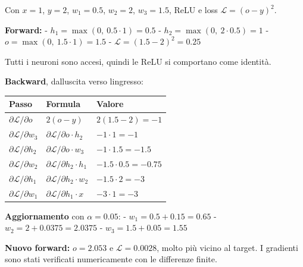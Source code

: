 \documentclass[11pt,a4paper,oneside,openany]{book}
\renewenvironment{quote}{\list{}{\leftmargin=1em\rightmargin=0pt}\item\relax}{\endlist}
\begin{document}
\begin{quote}
Con \(x = 1\), \(y = 2\), \(w_1 = 0.5\), \(w_2 = 2\), \(w_3 = 1.5\), ReLU e loss \(\mathcal{L} = (o-y)^2\).

\textbf{Forward:} - \(h_1 = \max(0,\ 0.5\cdot1) = 0.5\) - \(h_2 = \max(0,\ 2\cdot0.5) = 1\) - \(o = \max(0,\ 1.5\cdot1) = 1.5\) - \(\mathcal{L} = (1.5-2)^2 = 0.25\)

Tutti i neuroni sono accesi, quindi le ReLU si comportano come identità.

\textbf{Backward}, dall\textquotesingle uscita verso l\textquotesingle ingresso:

\begin{longtable}[]{@{}
  >{\raggedright\arraybackslash}p{}
  >{\raggedright\arraybackslash}p{}
  >{\raggedright\arraybackslash}p{}@{}}
\toprule\noalign{}
\begin{minipage}[b]{\linewidth}\raggedright
Passo
\end{minipage} & \begin{minipage}[b]{\linewidth}\raggedright
Formula
\end{minipage} & \begin{minipage}[b]{\linewidth}\raggedright
Valore
\end{minipage} \\
\midrule\noalign{}
\endhead
\bottomrule\noalign{}
\endlastfoot
\(\partial\mathcal{L}/\partial o\) & \(2(o-y)\) & \(2(1.5-2) = -1\) \\
\(\partial\mathcal{L}/\partial w_3\) & \(\partial\mathcal{L}/\partial o \cdot h_2\) & \(-1\cdot1 = -1\) \\
\(\partial\mathcal{L}/\partial h_2\) & \(\partial\mathcal{L}/\partial o \cdot w_3\) & \(-1\cdot1.5 = -1.5\) \\
\(\partial\mathcal{L}/\partial w_2\) & \(\partial\mathcal{L}/\partial h_2 \cdot h_1\) & \(-1.5\cdot0.5 = -0.75\) \\
\(\partial\mathcal{L}/\partial h_1\) & \(\partial\mathcal{L}/\partial h_2 \cdot w_2\) & \(-1.5\cdot2 = -3\) \\
\(\partial\mathcal{L}/\partial w_1\) & \(\partial\mathcal{L}/\partial h_1 \cdot x\) & \(-3\cdot1 = -3\) \\
\end{longtable}

\textbf{Aggiornamento} con \(\alpha = 0.05\): - \(w_1 = 0.5 + 0.15 = 0.65\) - \(w_2 = 2 + 0.0375 = 2.0375\) - \(w_3 = 1.5 + 0.05 = 1.55\)

\textbf{Nuovo forward:} \(o = 2.053\) e \(\mathcal{L} = 0.0028\), molto più vicino al target. I gradienti sono stati verificati numericamente con le differenze finite.
\end{quote}
\end{document}
